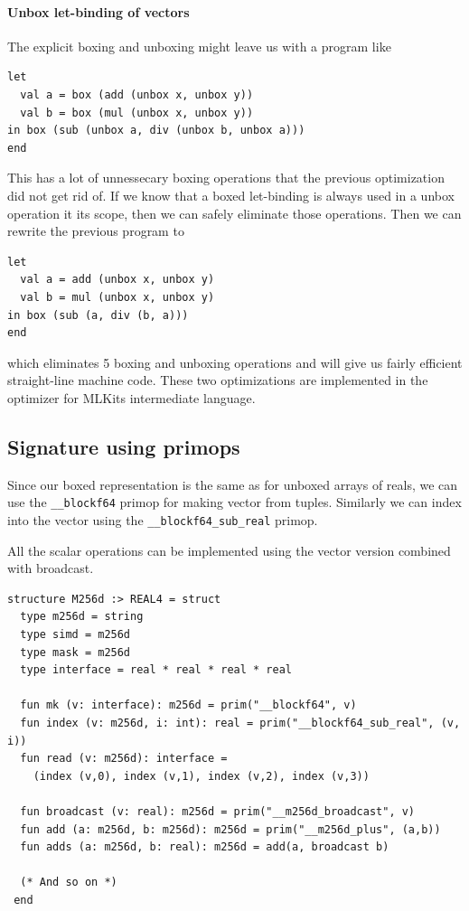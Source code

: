 \documentclass{article}
\begin{document}
\paragraph{Unbox let-binding of vectors}
The explicit boxing and unboxing might leave us with a program like
\begin{lstlisting}
let
  val a = box (add (unbox x, unbox y))
  val b = box (mul (unbox x, unbox y))
in box (sub (unbox a, div (unbox b, unbox a)))
end
\end{lstlisting}
This has a lot of unnessecary boxing operations that the previous optimization did not get rid of. If we know that a boxed let-binding is always used in a unbox operation it its scope, then we can safely eliminate those operations. Then we can rewrite the previous program to
\begin{lstlisting}
let
  val a = add (unbox x, unbox y)
  val b = mul (unbox x, unbox y)
in box (sub (a, div (b, a)))
end
\end{lstlisting}
which eliminates 5 boxing and unboxing operations and will give us fairly efficient straight-line machine code. These two optimizations are implemented in the optimizer for MLKits intermediate language.

\subsection{Signature using primops}

Since our boxed representation is the same as for unboxed arrays of reals, we can use the \verb!__blockf64! primop for making vector from tuples. Similarly we can index into the vector using the \verb!__blockf64_sub_real! primop.

All the scalar operations can be implemented using the vector version combined with broadcast.
\begin{verbatim}
structure M256d :> REAL4 = struct
  type m256d = string
  type simd = m256d
  type mask = m256d
  type interface = real * real * real * real

  fun mk (v: interface): m256d = prim("__blockf64", v)
  fun index (v: m256d, i: int): real = prim("__blockf64_sub_real", (v, i))
  fun read (v: m256d): interface =
    (index (v,0), index (v,1), index (v,2), index (v,3))

  fun broadcast (v: real): m256d = prim("__m256d_broadcast", v)
  fun add (a: m256d, b: m256d): m256d = prim("__m256d_plus", (a,b))
  fun adds (a: m256d, b: real): m256d = add(a, broadcast b)

  (* And so on *)
 end
\end{verbatim}
\end{document}
